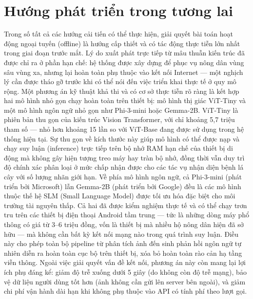 \section{Hướng phát triển trong tương lai}
Trong số tất cả các hướng cải tiến có thể thực hiện, giải quyết bài toán hoạt động ngoại tuyến (offline) là hướng cấp thiết và có tác động thực tiễn lớn nhất trong giai đoạn trước mắt. Lý do xuất phát trực tiếp từ mâu thuẫn kiến trúc đã được chỉ ra ở phần hạn chế: hệ thống được xây dựng để phục vụ nông dân vùng sâu vùng xa, nhưng lại hoàn toàn phụ thuộc vào kết nối Internet — một nghịch lý cần được tháo gỡ trước khi có thể nói đến việc triển khai thực tế ở quy mô rộng. Một phương án kỹ thuật khả thi và có cơ sở thực tiễn rõ ràng là kết hợp hai mô hình nhỏ gọn chạy hoàn toàn trên thiết bị: mô hình thị giác ViT-Tiny và một mô hình ngôn ngữ nhỏ gọn như Phi-3-mini hoặc Gemma-2B. ViT-Tiny là phiên bản thu gọn của kiến trúc Vision Transformer, với chỉ khoảng 5,7 triệu tham số — nhỏ hơn khoảng 15 lần so với ViT-Base đang được sử dụng trong hệ thống hiện tại. Sự thu gọn về kích thước này giúp mô hình có thể được nạp và chạy suy luận (inference) trực tiếp trên bộ nhớ RAM hạn chế của thiết bị di động mà không gây hiện tượng treo máy hay tràn bộ nhớ, đồng thời vẫn duy trì độ chính xác phân loại ở mức chấp nhận được cho các tác vụ nhận diện bệnh lá cây với số lượng nhãn giới hạn. Về phía mô hình ngôn ngữ, cả Phi-3-mini (phát triển bởi Microsoft) lẫn Gemma-2B (phát triển bởi Google) đều là các mô hình thuộc thế hệ SLM (Small Language Model) được tối ưu hóa đặc biệt cho môi trường tài nguyên thấp. Cả hai đã được kiểm nghiệm thực tế và có thể chạy trơn tru trên các thiết bị điện thoại Android tầm trung — tức là những dòng máy phổ thông có giá từ 3–6 triệu đồng, vốn là thiết bị mà nhiều hộ nông dân hiện đã sở hữu — mà không cần bất kỳ kết nối mạng nào trong quá trình suy luận. Điều này cho phép toàn bộ pipeline từ phân tích ảnh đến sinh phản hồi ngôn ngữ tự nhiên diễn ra hoàn toàn cục bộ trên thiết bị, xóa bỏ hoàn toàn rào cản hạ tầng viễn thông. Ngoài việc giải quyết vấn đề kết nối, phương án này còn mang lại lợi ích phụ đáng kể: giảm độ trễ xuống dưới 5 giây (do không còn độ trễ mạng), bảo vệ dữ liệu người dùng tốt hơn (ảnh không cần gửi lên server bên ngoài), và giảm chi phí vận hành dài hạn khi không phụ thuộc vào API có tính phí theo lượt gọi.


